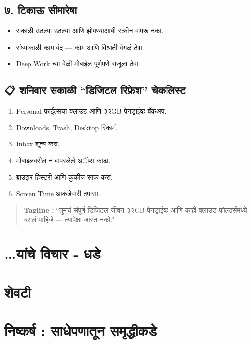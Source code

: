 \section*{७. टिकाऊ सीमारेषा}

\begin{itemize}
  \item सकाळी उठल्या उठल्या आणि झोपण्याआधी स्क्रीन वापरू नका.  
  \item संध्याकाळी काम बंद — काम आणि विश्रांती वेगळं ठेवा.  
  \item Deep Work च्या वेळी मोबाईल पूर्णपणे बाजूला ठेवा.  
\end{itemize}

\section*{📋 शनिवार सकाळी “डिजिटल रिफ्रेश” चेकलिस्ट}
\begin{enumerate}
  \item Personal फाईल्सचा क्लाउड आणि ३२GB पेनड्राईव्ह बॅकअप.  
  \item Downloads, Trash, Desktop रिकामं.  
  \item Inbox शून्य करा.  
  \item मोबाईलवरील न वापरलेले अॅप्स काढा.  
  \item ब्राउझर हिस्टरी आणि कुकीज साफ करा.  
  \item Screen Time आकडेवारी तपासा.  
\end{enumerate}

\begin{quote}
\textbf{Tagline :} “तुमचं संपूर्ण डिजिटल जीवन ३२GB पेनड्राईव्ह आणि काही क्लाउड फोल्डर्समध्ये बसलं पाहिजे — त्यापेक्षा जास्त नको.”  
\end{quote}

\chapter*{\ldots यांचे विचार - धडे }


\chapter*{शेवटी }

\chapter{निष्कर्ष : साधेपणातून समृद्धीकडे}

